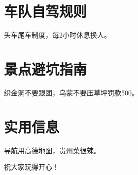 \documentclass[12pt,a4paper,UTF8]{ctexart}
\begin{document}
\section{车队自驾规则}
头车尾车制度，每2小时休息换人。

\section{景点避坑指南}
织金洞不要跟团，乌蒙不要压草坪罚款500。

\section{实用信息}
导航用高德地图，贵州菜很辣。

\vspace{3cm}
\begin{center}
\Huge \textcolor{primary}{祝大家玩得开心！}
\end{center}
\end{document}
